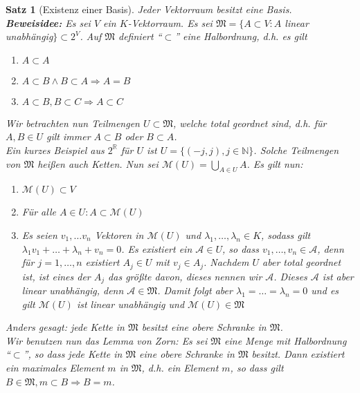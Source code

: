 \documentclass{report}
\newcommand{\lb}{\lambda}
\newcommand{\R}{\mathbb{R}}
\newcommand{\N}{\mathbb{N}}
\theoremstyle{customrem}
\theoremstyle{customdef}
\newtheorem{satz}[definition]{Satz}
\begin{document}
	\begin{satz}[Existenz einer Basis]
		Jeder Vektorraum besitzt eine Basis.\\
		
		\noindent\textbf{Beweisidee: }	Es sei $V$ ein $K$-Vektorraum. Es sei $\mathfrak{M} = \{A \subset V : A$ linear unabhängig$\} \subset 2^V$. Auf $\mathfrak{M}$ definiert "`$\subset$"' eine Halbordnung, d.h. es gilt 
		\begin{enumerate}[leftmargin=5cm]
			\item $A \subset A$
			\item $A \subset B \land B \subset A \Rightarrow A = B$
			\item $A \subset B, B \subset C \Rightarrow A \subset C$
		\end{enumerate}
		Wir betrachten nun Teilmengen $U \subset \mathfrak{M}$, welche total geordnet sind, d.h. für $A, B \in U$ gilt immer $A \subset B$ oder $B \subset A$.\\
		
		\noindent Ein kurzes Beispiel aus $2^\R$ für $U$ ist $U = \{(-j, j), j \in \N\}$. Solche Teilmengen von $\mathfrak{M}$ heißen auch Ketten. Nun sei $\mathcal{M}(U) = \bigcup_{A \in U} A$. Es gilt nun:
		\begin{enumerate}
			\item $\mathcal{M}(U) \subset V$
			\item Für alle $A \in U : A \subset \mathcal{M}(U)$
			\item Es seien $v_1, \dots v_n$ Vektoren in $\mathcal{M}(U)$ und $\lb_1, \ldots, \lb_n \in K$, sodass gilt $\lb_1 v_1 + \ldots + \lb_n + v_n = 0$.
			Es existiert ein $\mathcal{A} \in U$, so dass $v_1, \ldots, v_n \in \mathcal{A}$, denn für $j = 1, \ldots, n$ existiert $A_j \in U$ mit $v_j \in A_j$. Nachdem $U$ aber total geordnet ist, ist eines der $A_j$ das größte davon, dieses nennen wir $\mathcal{A}$. Dieses $\mathcal{A}$ ist aber linear unabhängig, denn $\mathcal{A} \in \mathfrak{M}$. Damit folgt aber $\lb_1 = \dots = \lb_n = 0$ und es gilt $\mathcal{M}(U)$ ist linear unabhängig und $\mathcal{M}(U) \in \mathfrak{M}$
		\end{enumerate}
		Anders gesagt: jede Kette in $\mathfrak{M}$ besitzt eine obere Schranke in $\mathfrak{M}$.\\
		
		\noindent Wir benutzen nun das Lemma von Zorn: Es sei $\mathfrak{M}$ eine Menge mit Halbordnung "`$\subset$"', so dass jede Kette in  $\mathfrak{M}$ eine obere Schranke in $\mathfrak{M}$ besitzt. Dann existiert ein maximales Element $m$ in  $\mathfrak{M}$, d.h. ein Element $m$, so dass gilt $B \in  \mathfrak{M}, m \subset B \Rightarrow B = m$.\\
		

\end{satz}
\end{document}
